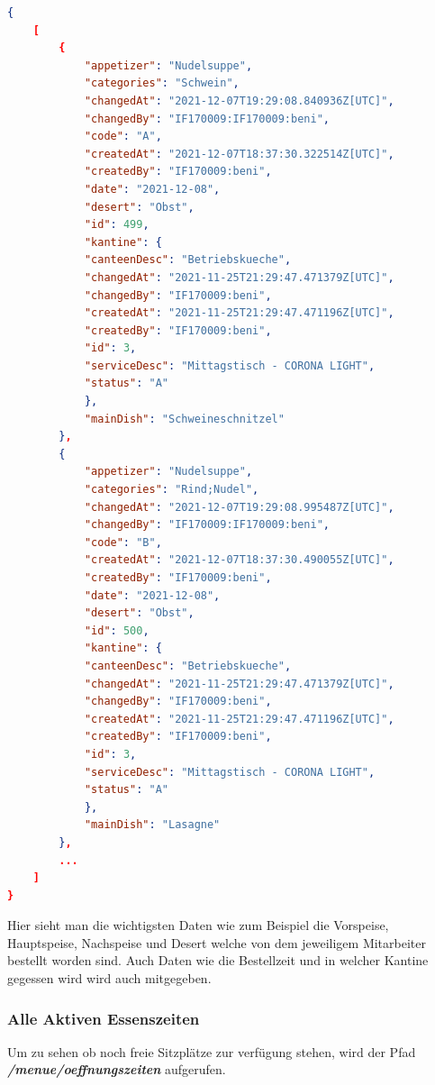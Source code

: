 \begin{lstlisting}[language=json,firstnumber=1]
{
    [
        {
            "appetizer": "Nudelsuppe",
            "categories": "Schwein",
            "changedAt": "2021-12-07T19:29:08.840936Z[UTC]",
            "changedBy": "IF170009:IF170009:beni",
            "code": "A",
            "createdAt": "2021-12-07T18:37:30.322514Z[UTC]",
            "createdBy": "IF170009:beni",
            "date": "2021-12-08",
            "desert": "Obst",
            "id": 499,
            "kantine": {
            "canteenDesc": "Betriebskueche",
            "changedAt": "2021-11-25T21:29:47.471379Z[UTC]",
            "changedBy": "IF170009:beni",
            "createdAt": "2021-11-25T21:29:47.471196Z[UTC]",
            "createdBy": "IF170009:beni",
            "id": 3,
            "serviceDesc": "Mittagstisch - CORONA LIGHT",
            "status": "A"
            },
            "mainDish": "Schweineschnitzel"
        },
        {
            "appetizer": "Nudelsuppe",
            "categories": "Rind;Nudel",
            "changedAt": "2021-12-07T19:29:08.995487Z[UTC]",
            "changedBy": "IF170009:IF170009:beni",
            "code": "B",
            "createdAt": "2021-12-07T18:37:30.490055Z[UTC]",
            "createdBy": "IF170009:beni",
            "date": "2021-12-08",
            "desert": "Obst",
            "id": 500,
            "kantine": {
            "canteenDesc": "Betriebskueche",
            "changedAt": "2021-11-25T21:29:47.471379Z[UTC]",
            "changedBy": "IF170009:beni",
            "createdAt": "2021-11-25T21:29:47.471196Z[UTC]",
            "createdBy": "IF170009:beni",
            "id": 3,
            "serviceDesc": "Mittagstisch - CORONA LIGHT",
            "status": "A"
            },
            "mainDish": "Lasagne"
        },
        ...
    ]
}
\end{lstlisting}

Hier sieht man die wichtigsten Daten wie zum Beispiel die Vorspeise, Hauptspeise, Nachspeise und Desert welche von  dem jeweiligem Mitarbeiter bestellt worden sind. 
Auch Daten wie die Bestellzeit und in welcher Kantine gegessen wird wird auch mitgegeben.

\subsubsection{Alle Aktiven Essenszeiten}

Um zu sehen ob noch freie Sitzplätze zur verfügung stehen, wird der Pfad \textbf{\textit{/menue/oeffnungszeiten}} aufgerufen. 

